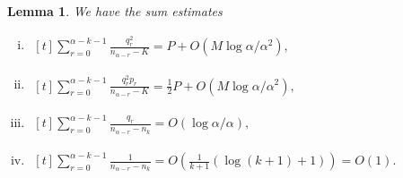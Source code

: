 \documentclass{article}
\theoremstyle{plain}
\theoremstyle{remark}
\theoremstyle{plain}
\newtheorem{lemma}[theorem]{Lemma}
\numberwithin{equation}{section}
\begin{document}
	\begin{lemma}\label{lemma_sums}
		We have the sum estimates
		\begin{enumerate}[(i)]
			\item\label{lemma_sums_1} $\begin{aligned}[t]
				\sum_{r=0}^{\alpha-k-1}\frac{q_r^2}{n_{\alpha-r}-K}=P+O(M\log\alpha/\alpha^2),
			\end{aligned}$
			\item\label{lemma_sums_2} $\begin{aligned}[t]
				\sum_{r=0}^{\alpha-k-1}\frac{q_r^2p_r}{n_{\alpha-r}-K}=\frac12P+O(M\log\alpha/\alpha^2),
			\end{aligned}$
			\item\label{lemma_sums_3} $\begin{aligned}[t]
				\sum_{r=0}^{\alpha-k-1}\frac{q_r}{n_{\alpha-r}-n_k}=O(\log\alpha/\alpha),
			\end{aligned}$
			\item\label{lemma_sums_4} $\begin{aligned}[t]
				\sum_{r=0}^{\alpha-k-1}\frac1{n_{\alpha-r}-n_k}=O(\tfrac1{k+1}(\log(k+1)+1))=O(1).
			\end{aligned}$
		\end{enumerate}
	\end{lemma}
	
\end{document}
